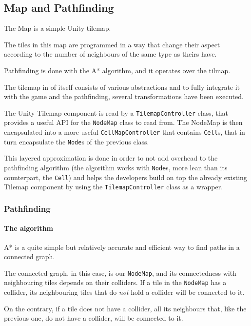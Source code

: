 \subsection{Map and Pathfinding}


The Map is a simple Unity \gls{tilemap}.

The tiles in this map are programmed in a way that change their aspect
according to the number of neighbours of the same type as theirs have.

Pathfinding is done with the A* algorithm, and it operates over the tilmap.

The tilemap in of itself consists of various abstractions
and to fully integrate it with the game and the pathfinding, several transformations
have been executed.

The Unity Tilemap component is read by a \texttt{TilemapController} class,
that provides a useful API for the \texttt{NodeMap} class to read from. The
NodeMap is then encapsulated into a more useful \texttt{CellMapController}
that contains \texttt{Cell}s, that in turn encapsulate the \texttt{Node}s
of the previous class.

This layered approximation is done in order to not add overhead to the
pathfinding algorithm (the algorithm works with \texttt{Node}s, more
lean than its counterpart, the \texttt{Cell}) and helps the developers
build on top the already existing Tilemap component by using the
\texttt{TilemapController} class as a wrapper.

\subsubsection{Pathfinding}

\paragraph{The algorithm}

A* is a quite simple but relatively accurate and efficient way to find
paths in a connected graph.

The connected graph, in this case, is our \texttt{NodeMap}, and its connectedness
with neighbouring tiles depends on their \glspl{collider}. If a tile in the \texttt{NodeMap}
has a collider, its neighbouring tiles that do \emph{not}
hold a collider will be connected to it. 

On the contrary, if a tile does not have a collider, all its neighbours that,
like the previous one, do not have a collider, will be connected to it.

